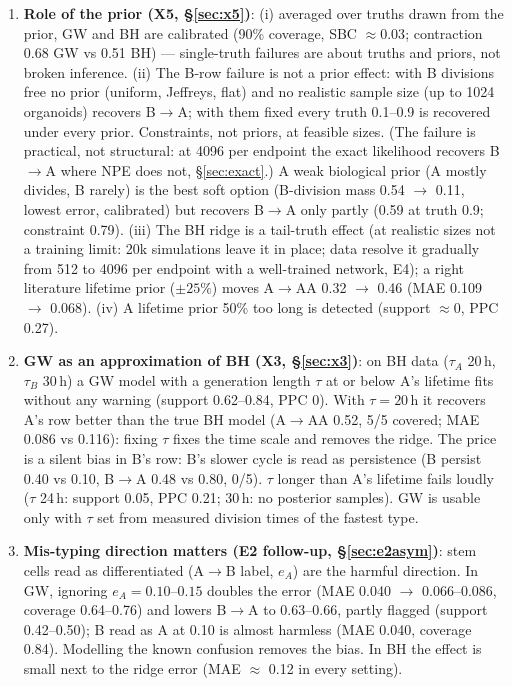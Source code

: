 \documentclass[10pt,a4paper]{article}
\newcommand{\tA}{$\tau_A$}
\newcommand{\tB}{$\tau_B$}
\begin{document}
\begin{enumerate}[leftmargin=1.4em]
\item \textbf{Role of the prior (X5, \S\ref{sec:x5})}: (i) averaged over truths drawn from the prior, GW and BH are calibrated (90\% coverage, SBC $\approx 0.03$; contraction 0.68 GW vs 0.51 BH) --- single-truth failures are about truths and priors, not broken inference. (ii) The B-row failure is not a prior effect: with B divisions free no prior (uniform, Jeffreys, flat) and no realistic sample size (up to 1024 organoids) recovers B$\to$A; with them fixed every truth 0.1--0.9 is recovered under every prior. Constraints, not priors, at feasible sizes. (The failure is practical, not structural: at 4096 per endpoint the exact likelihood recovers B$\to$A where NPE does not, \S\ref{sec:exact}.) A weak biological prior (A mostly divides, B rarely) is the best soft option (B-division mass 0.54 $\to$ 0.11, lowest error, calibrated) but recovers B$\to$A only partly (0.59 at truth 0.9; constraint 0.79). (iii) The BH ridge is a tail-truth effect (at realistic sizes not a training limit: 20k simulations leave it in place; data resolve it gradually from 512 to 4096 per endpoint with a well-trained network, E4); a right literature lifetime prior ($\pm 25\%$) moves A$\to$AA 0.32 $\to$ 0.46 (MAE 0.109 $\to$ 0.068). (iv) A lifetime prior 50\% too long is detected (support $\approx 0$, PPC 0.27).
\item \textbf{GW as an approximation of BH (X3, \S\ref{sec:x3})}: on BH data (\tA{} 20\,h, \tB{} 30\,h) a GW model with a generation length $\tau$ at or below A's lifetime fits without any warning (support 0.62--0.84, PPC 0). With $\tau = 20$\,h it recovers A's row better than the true BH model (A$\to$AA 0.52, 5/5 covered; MAE 0.086 vs 0.116): fixing $\tau$ fixes the time scale and removes the ridge. The price is a silent bias in B's row: B's slower cycle is read as persistence (B persist 0.40 vs 0.10, B$\to$A 0.48 vs 0.80, 0/5). $\tau$ longer than A's lifetime fails loudly ($\tau$ 24\,h: support 0.05, PPC 0.21; 30\,h: no posterior samples). GW is usable only with $\tau$ set from measured division times of the fastest type.
\item \textbf{Mis-typing direction matters (E2 follow-up, \S\ref{sec:e2asym})}: stem cells read as differentiated (A$\to$B label, $e_A$) are the harmful direction. In GW, ignoring $e_A = 0.10$--$0.15$ doubles the error (MAE 0.040 $\to$ 0.066--0.086, coverage 0.64--0.76) and lowers B$\to$A to 0.63--0.66, partly flagged (support 0.42--0.50); B read as A at 0.10 is almost harmless (MAE 0.040, coverage 0.84). Modelling the known confusion removes the bias. In BH the effect is small next to the ridge error (MAE $\approx$ 0.12 in every setting).

\end{enumerate}
\end{document}
